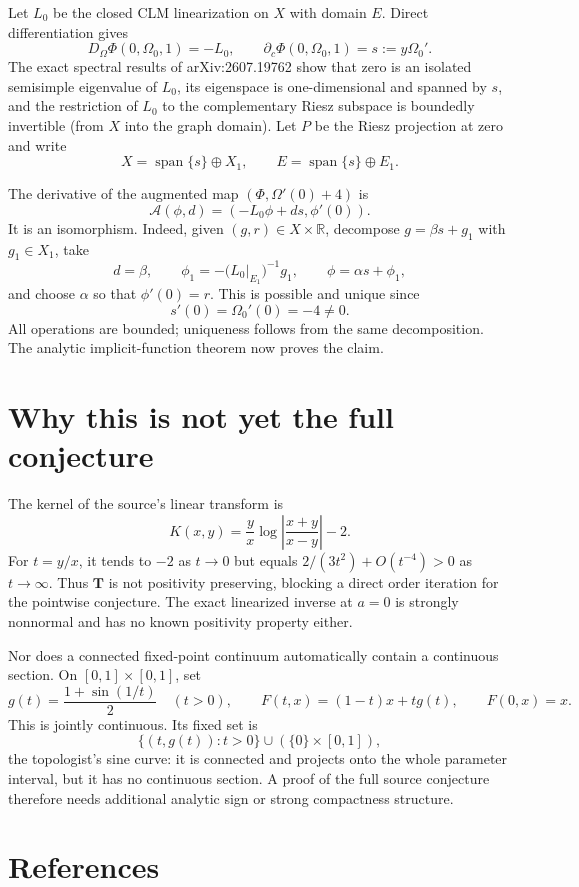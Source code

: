 \documentclass[11pt]{article}
\newcommand{\R}{\mathbb R}
\newcommand{\cT}{\mathbf T}
\begin{document}
Let $L_0$ be the closed CLM linearization on $X$ with domain $E$.  Direct
differentiation gives
\[
 D_\Omega\Phi(0,\Omega_0,1)=-L_0,
 \qquad \partial_c\Phi(0,\Omega_0,1)=s:=y\Omega_0'.
\]
The exact spectral results of arXiv:2607.19762 show that zero is an isolated
semisimple eigenvalue of $L_0$, its eigenspace is one-dimensional and spanned
by $s$, and the restriction of $L_0$ to the complementary Riesz subspace is
boundedly invertible (from $X$ into the graph domain).  Let $P$ be the Riesz
projection at zero and write
\[
 X=\operatorname{span}\{s\}\oplus X_1,
 \qquad E=\operatorname{span}\{s\}\oplus E_1.
\]

The derivative of the augmented map
$(\Phi,\Omega'(0)+4)$ is
\[
 \mathcal A(\phi,d)=(-L_0\phi+ds,\phi'(0)).
\]
It is an isomorphism.  Indeed, given $(g,r)\in X\times\R$, decompose
$g=\beta s+g_1$ with $g_1\in X_1$, take
\[
 d=\beta,
 \qquad \phi_1=-\bigl(L_0|_{E_1}\bigr)^{-1}g_1,
 \qquad \phi=\alpha s+\phi_1,
\]
and choose $\alpha$ so that $\phi'(0)=r$.  This is possible and unique since
\[
 s'(0)=\Omega_0'(0)=-4\neq0.
\]
All operations are bounded; uniqueness follows from the same decomposition.
The analytic implicit-function theorem now proves the claim.

\section{Why this is not yet the full conjecture}

The kernel of the source's linear transform is
\[
 K(x,y)=\frac yx\log\left|\frac{x+y}{x-y}\right|-2.
\]
For $t=y/x$, it tends to $-2$ as $t\to0$ but equals
$2/(3t^2)+O(t^{-4})>0$ as $t\to\infty$.  Thus $\cT$ is not positivity
preserving, blocking a direct order iteration for the pointwise conjecture.
The exact linearized inverse at $a=0$ is strongly nonnormal and has no known
positivity property either.

Nor does a connected fixed-point continuum automatically contain a
continuous section.  On $[0,1]\times[0,1]$, set
\[
 g(t)=\frac{1+\sin(1/t)}2\quad(t>0),\qquad
 F(t,x)=(1-t)x+tg(t),\qquad F(0,x)=x.
\]
This is jointly continuous.  Its fixed set is
\[
 \{(t,g(t)):t>0\}\cup(\{0\}\times[0,1]),
\]
the topologist's sine curve: it is connected and projects onto the whole
parameter interval, but it has no continuous section.  A proof of the full
source conjecture therefore needs additional analytic sign or strong
compactness structure.

\section*{References}
\end{document}
